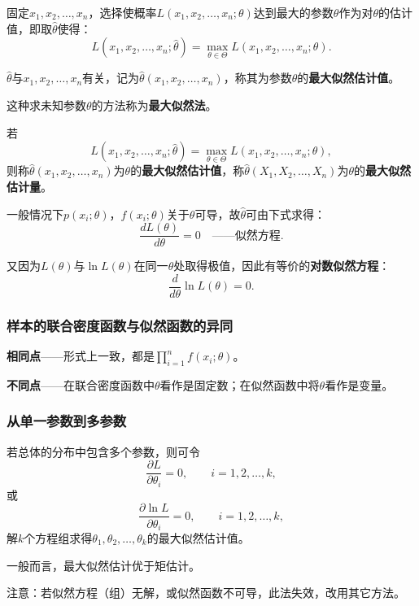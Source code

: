 \documentclass[11pt,a4paper]{report}
\theoremstyle{definition}
\begin{document}
固定$x_{1},x_{2},\ldots,x_{n}$，选择使概率$L(x_{1},x_{2},\ldots,x_{n};\theta)$达到最大的参数$\theta$作为对$\theta$的估计值，即取$\hat{\theta}$使得：
\[
L(x_{1},x_{2},\ldots,x_{n};\hat{\theta})=\max_{\theta\in\Theta}L(x_{1},x_{2},\ldots,x_{n};\theta).
\]

$\hat{\theta}$与$x_{1},x_{2},\ldots,x_{n}$有关，记为$\hat{\theta}(x_{1},x_{2},\ldots,x_{n})$，称其为参数$\theta$的\textbf{最大似然估计值}。

这种求未知参数$\theta$的方法称为\textbf{最大似然法}。

若
\[
L(x_{1},x_{2},\ldots,x_{n};\hat{\theta})=\max_{\theta\in\Theta}L(x_{1},x_{2},\ldots,x_{n};\theta),
\]
则称$\hat{\theta}(x_{1},x_{2},\ldots,x_{n})$为$\theta$的\textbf{最大似然估计值}，称$\hat{\theta}(X_{1},X_{2},\ldots,X_{n})$为$\theta$的\textbf{最大似然估计量}。

一般情况下$p(x_{i};\theta)$，$f(x_{i};\theta)$关于$\theta$可导，故$\hat{\theta}$可由下式求得：
\[
\frac{dL(\theta)}{d\theta}=0\quad\text{——似然方程}.
\]

又因为$L(\theta)$与$\ln L(\theta)$在同一$\theta$处取得极值，因此有等价的\textbf{对数似然方程}：
\[
\frac{d}{d\theta}\ln L(\theta)=0.
\]

\subsubsection*{样本的联合密度函数与似然函数的异同}

\textbf{相同点}——形式上一致，都是$\displaystyle\prod_{i=1}^{n}f(x_{i};\theta)$。

\textbf{不同点}——在联合密度函数中$\theta$看作是固定数；在似然函数中将$\theta$看作是变量。

\subsubsection*{从单一参数到多参数}

若总体的分布中包含多个参数，则可令
\[
\frac{\partial L}{\partial\theta_{i}}=0,\qquad i=1,2,\ldots,k,
\]
或
\[
\frac{\partial\ln L}{\partial\theta_{i}}=0,\qquad i=1,2,\ldots,k,
\]
解$k$个方程组求得$\theta_{1},\theta_{2},\ldots,\theta_{k}$的最大似然估计值。

一般而言，最大似然估计优于矩估计。

注意：若似然方程（组）无解，或似然函数不可导，此法失效，改用其它方法。
\end{document}
